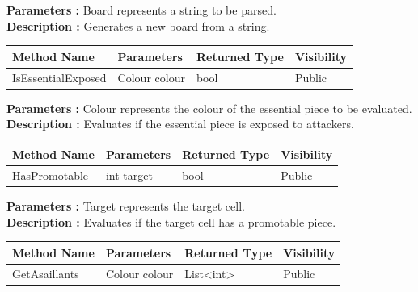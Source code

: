 \documentclass[12pt]{article}
\begin{document}
\textbf{Parameters :} Board represents a string to be parsed. 
\\

\textbf{Description :} Generates a new board from a string.

\begin{table}[H]
    \begin{tabular}{|l|l|l|l|}
    \hline
    \rowcolor[HTML]{EFEFEF} 
    \cellcolor[HTML]{EFEFEF}\textbf{Method Name} & \textbf{Parameters}     & \textbf{Returned Type} & \textbf{Visibility} \\ \hline
    IsEssentialExposed                           & Colour colour           & bool                   & Public              \\ \hline
    \end{tabular}
\end{table}

\textbf{Parameters :} Colour represents the colour of the essential piece to be evaluated. 
\\

\textbf{Description :} Evaluates if the essential piece is exposed to attackers.

\begin{table}[H]
    \begin{tabular}{|l|l|l|l|}
    \hline
    \rowcolor[HTML]{EFEFEF} 
    \cellcolor[HTML]{EFEFEF}\textbf{Method Name} & \textbf{Parameters}     & \textbf{Returned Type} & \textbf{Visibility} \\ \hline
    HasPromotable                                & int target              & bool                   & Public              \\ \hline
    \end{tabular}
\end{table}

\textbf{Parameters :} Target represents the target cell.  
\\

\textbf{Description :} Evaluates if the target cell has a promotable piece. 

\begin{table}[H]
    \begin{tabular}{|l|l|l|l|}
    \hline
    \rowcolor[HTML]{EFEFEF} 
    \cellcolor[HTML]{EFEFEF}\textbf{Method Name} & \textbf{Parameters}     & \textbf{Returned Type} & \textbf{Visibility} \\ \hline
    GetAsaillants                                & Colour colour           & List<int>                   & Public              \\ \hline
    \end{tabular}
\end{table}
\end{document}
